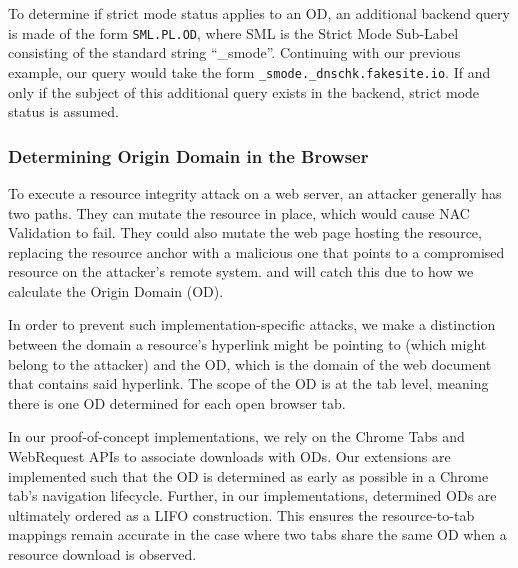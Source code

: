 To determine if strict mode status applies to an OD, an additional backend query
is made of the form \texttt{SML.PL.OD}, where SML is the Strict Mode Sub-Label
consisting of the standard string ``\_smode''. Continuing with our previous
example, our query would take the form \texttt{\_smode.\_dnschk.fakesite.io}. If
and only if the subject of this additional query exists in the backend, strict
mode status is assumed.

\subsubsection{Determining Origin Domain in the Browser}

To execute a resource integrity attack on a web server, an attacker generally
has two paths. They can mutate the resource in place, which would cause NAC
Validation to fail. They could also mutate the web page hosting the resource,
replacing the resource anchor with a malicious one that points to a compromised
resource on the attacker's remote system. \DNSSYS{} and \DHTSYS{} will catch
this due to how we calculate the Origin Domain (OD).

In order to prevent such implementation-specific attacks, we make a distinction
between the domain a resource's hyperlink might be pointing to (which might
belong to the attacker) and the OD, which is the domain of the web document that
contains said hyperlink. The scope of the OD is at the tab level, meaning there
is one OD determined for each open browser tab.

In our proof-of-concept implementations, we rely on the Chrome Tabs and
WebRequest APIs to associate downloads with ODs. Our extensions are implemented
such that the OD is determined as early as possible in a Chrome tab's navigation
lifecycle. Further, in our implementations, determined ODs are ultimately
ordered as a LIFO construction. This ensures the resource-to-tab mappings remain
accurate in the case where two tabs share the same OD when a resource download
is observed.
